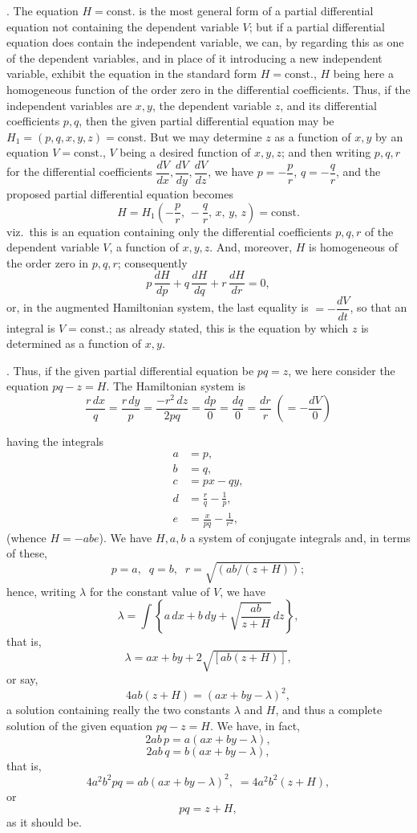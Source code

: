 \documentclass[11pt,a4paper]{article}
\begin{document}
. The equation $H = \text{const.}$ is the most general form of a partial differential equation not containing the dependent variable $V$; but if a partial differential equation does contain the independent variable, we can, by regarding this as one of the dependent variables, and in place of it introducing a new independent variable, exhibit the equation in the standard form $H = \text{const.}$, $H$ being here a homogeneous function of the order zero in the differential coefficients. Thus, if the independent variables are $x, y$, the dependent variable $z$, and its differential coefficients $p, q$, then the given partial differential equation may be $H_{1} = (p, q, x, y, z) = \text{const.}$ But we may determine $z$ as a function of $x, y$ by an equation $V = \text{const.}$, $V$ being a desired function of $x, y, z$; and then writing $p, q, r$ for the differential coefficients $\dfrac{dV}{dx}, \dfrac{dV}{dy}, \dfrac{dV}{dz}$, we have $p = -\dfrac{p}{r}$, $q = -\dfrac{q}{r}$, and the proposed partial differential equation becomes
\[
H = H_{1}\!\left(-\frac{p}{r},\, -\frac{q}{r},\, x,\, y,\, z\right) = \text{const.}
\]
viz.\ this is an equation containing only the differential coefficients $p, q, r$ of the dependent variable $V$, a function of $x, y, z$. And, moreover, $H$ is homogeneous of the order zero in $p, q, r$; consequently
\[
p\,\frac{dH}{dp} + q\,\frac{dH}{dq} + r\,\frac{dH}{dr} = 0,
\]
or, in the augmented Hamiltonian system, the last equality is $= -\dfrac{dV}{dt}$, so that an integral is $V = \text{const.}$; as already stated, this is the equation by which $z$ is determined as a function of $x, y$.

\medskip

. Thus, if the given partial differential equation be $pq = z$, we here consider the equation $pq - z = H$. The Hamiltonian system is
\[
\frac{r\,dx}{q} = \frac{r\,dy}{p} = \frac{-r^{2}\,dz}{2pq} = \frac{dp}{0} = \frac{dq}{0} = \frac{dr}{r}\;\left( = -\frac{dV}{0} \right)
\]

\newpage


having the integrals
\[
\begin{aligned}
a &= p,\\
b &= q,\\
c &= px - qy,\\
d &= \frac{r}{q} - \frac{1}{p},\\
e &= \frac{x}{pq} - \frac{1}{r^{2}},
\end{aligned}
\]
(whence $H = -abe$). We have $H, a, b$ a system of conjugate integrals and, in terms of these,
\[
p = a, \;\; q = b, \;\; r = \sqrt{(ab/(z + H))};
\]
hence, writing $\lambda$ for the constant value of $V$, we have
\[
\lambda = \int\!\left\{ a\,dx + b\,dy + \sqrt{\frac{ab}{z + H}}\,dz \right\},
\]
that is,
\[
\lambda = ax + by + 2\sqrt{[ab(z + H)]},
\]
or say,
\[
4ab(z + H) = (ax + by - \lambda)^{2},
\]
a solution containing really the two constants $\lambda$ and $H$, and thus a complete solution of the given equation $pq - z = H$. We have, in fact,
\[
2ab\,p = a(ax + by - \lambda),
\]
\[
2ab\,q = b(ax + by - \lambda),
\]
that is,
\[
4a^{2}b^{2}pq = ab(ax + by - \lambda)^{2}, \; = 4a^{2}b^{2}(z + H),
\]
or
\[
pq = z + H,
\]
as it should be.
\end{document}

